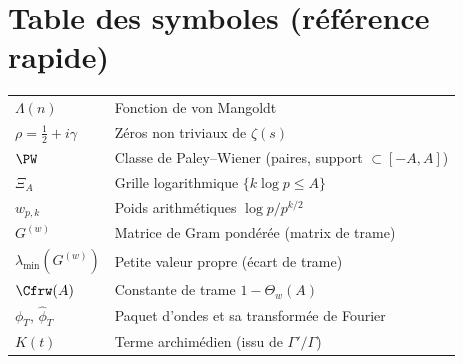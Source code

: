 \section*{Table des symboles (référence rapide)}
\begin{tabular}{@{}ll@{}}
$\Lambda(n)$ & Fonction de von Mangoldt \\[2pt]
$\rho = \tfrac12 + i\gamma$ & Zéros non triviaux de $\zeta(s)$ \\[2pt]
$\PW$ & Classe de Paley--Wiener (paires, support $\subset[-A,A]$) \\[2pt]
$\Xi_A$ & Grille logarithmique $\{k\log p\le A\}$ \\[2pt]
$w_{p,k}$ & Poids arithmétiques $\log p / p^{k/2}$ \\[2pt]
$G^{(w)}$ & Matrice de Gram pondérée (matrix de trame) \\[2pt]
$\lambda_{\min}(G^{(w)})$ & Petite valeur propre (écart de trame) \\[2pt]
$\Cfrw(A)$ & Constante de trame $1-\Theta_w(A)$ \\[2pt]
$\phi_T,\,\hat\phi_T$ & Paquet d’ondes et sa transformée de Fourier \\[2pt]
$K(t)$ & Terme archimédien (issu de $\Gamma'/\Gamma$) \\[2pt]
\end{tabular}
